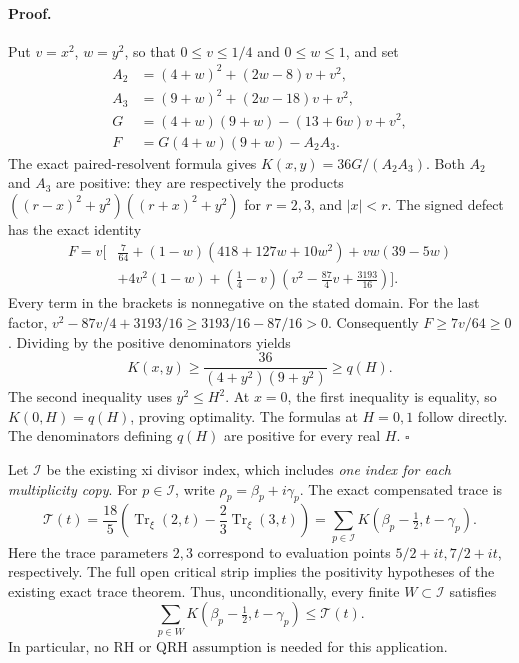 \paragraph{Proof.}
Put \(v=x^2\), \(w=y^2\), so that \(0\le v\le1/4\) and
\(0\le w\le1\), and set
\[
 \begin{aligned}
 A_2&=(4+w)^2+(2w-8)v+v^2,\\
 A_3&=(9+w)^2+(2w-18)v+v^2,\\
 G&=(4+w)(9+w)-(13+6w)v+v^2,\\
 F&=G(4+w)(9+w)-A_2A_3.
 \end{aligned}
\]
The exact paired-resolvent formula gives
\(K(x,y)=36G/(A_2A_3)\).  Both \(A_2\) and \(A_3\) are positive:
they are respectively the products
\(((r-x)^2+y^2)((r+x)^2+y^2)\) for \(r=2,3\), and \(|x|<r\).
The signed defect has the exact identity
\[
 \begin{aligned}
 F=v\bigl[&\tfrac7{64}
 +(1-w)(418+127w+10w^2)
 +vw(39-5w)\\
 &+4v^2(1-w)
 +(\tfrac14-v)(v^2-\tfrac{87}{4}v+\tfrac{3193}{16})\bigr].
 \end{aligned}
\]
Every term in the brackets is nonnegative on the stated domain.  For the
last factor, \(v^2-87v/4+3193/16\ge3193/16-87/16>0\).
Consequently \(F\ge7v/64\ge0\).  Dividing by the positive denominators
yields
\[
 K(x,y)\ge\frac{36}{(4+y^2)(9+y^2)}\ge q(H).
\]
The second inequality uses \(y^2\le H^2\).  At \(x=0\), the first
inequality is equality, so \(K(0,H)=q(H)\), proving optimality.
The formulas at \(H=0,1\) follow directly.  The denominators defining
\(q(H)\) are positive for every real \(H\). \(\square\)

Let \(\mathcal I\) be the existing xi divisor index, which includes
\emph{one index for each multiplicity copy}.  For \(p\in\mathcal I\),
write \(\rho_p=\beta_p+i\gamma_p\).  The exact compensated trace is
\[
 \mathcal T(t)=\frac{18}{5}
 \left(\operatorname{Tr}_{\xi}(2,t)
       -\frac23\operatorname{Tr}_{\xi}(3,t)\right)
 =\sum_{p\in\mathcal I}K(\beta_p-\tfrac12,t-\gamma_p).
\]
Here the trace parameters \(2,3\) correspond to evaluation points
\(5/2+it,7/2+it\), respectively.  The full open critical strip implies
the positivity hypotheses of the existing exact trace theorem.  Thus,
unconditionally, every finite \(W\subset\mathcal I\) satisfies
\[
 \sum_{p\in W}K(\beta_p-\tfrac12,t-\gamma_p)\le\mathcal T(t).
\]
In particular, no RH or QRH assumption is needed for this application.

